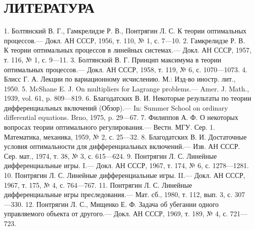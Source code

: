 \documentclass[10pt]{article}
\begin{document}
\section*{ЛИТЕРАТУРА}
1. Болтянский В. Г., Гамкрелидзе Р. В., Понтрягин Л. С. К теории оптимальных процессов.— Докл. АН СССР, 1956, т. 110, № 1, с. 7—10.
2. Гамкрелидзе Р. В. К теории оптимальных процессов в линейных системах.— Докл. АН СССР, 1957, т. 116, № 1, с. 9—11.
3. Болтянский В. Г. Принцип максимума в теории оптимальных процессов.— Докл. АН СССР, 1958, т. 119, № 6, с. 1070—1073.
4. Блисс Г. А. Лекции по вариационному исчислению. М.: Изд-во иностр. лит., 1950.
5. McShane E. J. On multipliers for Lagrange problems.— Amer. J. Math., 1939, vol. 61, p. 809—819.
6. Благодатских В. И. Некоторые результаты по теории дифференциальных включений (Обзор).— In: Summer School on ordinary differential equations. Brno, 1975, p. 29—67.
7. Филиппов А. Ф. О некоторых вопросах теории оптимального регулирования.— Вестн. МГУ. Сер. 1. Математика, механика, 1959, № 2, с. 25—32.
8. Благодатских В. И. Достаточные условия оптимальности для дифференциальных включений.— Изв. АН СССР. Сер. мат., 1974, т. 38, № 3, с. 615—624.
9. Понтрягин Л. С. Линейные дифференциальные игры. I.— Докл. АН СССР, 1967, т. 174, № 6, с. 1278—1281.
10. Понтрягин Л. С. Линейные дифференциальные игры. II.— Докл. АН СССР, 1967, т. 175, № 4, с. 764—767.
11. Понтрягин Л. С. Линейные дифференциальные игры преследования.— Мат. сб., 1980, т. 112, вып. 3, с. 307—330.
12. Понтрягин Л. С., Мищенко Е. Ф. Задача об убегании одного управляемого объекта от другого.— Докл. АН СССР, 1969, т. 189, № 4, с. 721—723.
\end{document}
